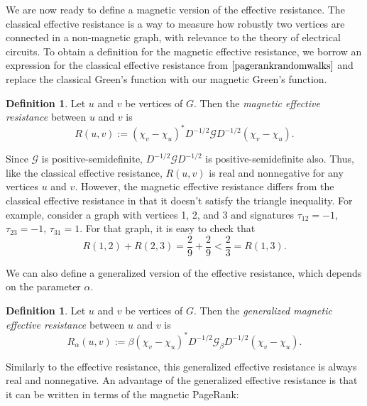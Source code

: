 \documentclass{article}
\theoremstyle{definition}
\newtheorem{defn}[thm]{Definition}
\newcommand{\green}{\mathcal{G}}
\begin{document}
We are now ready to define a magnetic version of the effective resistance. The classical effective resistance is a way to measure how robustly two vertices are connected in a non-magnetic graph, with relevance to the theory of electrical circuits. To obtain a definition for the magnetic effective resistance, we borrow an expression for the classical effective resistance from $\cite{pagerankrandomwalks}$ and replace the classical Green's function with our magnetic Green's function.

\begin{defn}
Let $u$ and $v$ be vertices of $G$. Then the  \textit{magnetic effective resistance} between $u$ and $v$ is 
$$
R(u, v) := (\chi_v - \chi_u)^* D^{-1/2} \green D^{-1/2} (\chi_v - \chi_u).
$$
\end{defn}

Since $\green$ is positive-semidefinite, $D^{-1/2} \green D^{-1/2}$ is positive-semidefinite also. Thus, like the classical effective resistance, $R(u, v)$ is real and nonnegative for any vertices $u$ and $v$. However, the magnetic effective resistance differs from the classical effective resistance in that it doesn't satisfy the triangle inequality. For example, consider a graph with vertices 1, 2, and 3 and signatures $\tau_{12} = -1$, $\tau_{23} = -1$, $\tau_{31} = 1$. For that graph, it is easy to check that
$$
R(1, 2) + R(2, 3) = \frac{2}{9} + \frac{2}{9} < \frac{2}{3} = R(1, 3).
$$

We can also define a generalized version of the effective resistance, which depends on the parameter $\alpha$.

\begin{defn}
Let $u$ and $v$ be vertices of $G$. Then the \textit{generalized magnetic effective resistance} between $u$ and $v$ is 
$$
R_\alpha(u, v) := \beta (\chi_v - \chi_u)^* D^{-1/2} \green_\beta D^{-1/2} (\chi_v - \chi_u).
$$
\end{defn}

Similarly to the effective resistance, this generalized effective resistance is always real and nonnegative. An advantage of the generalized effective resistance is that it can be written in terms of the magnetic PageRank:
\end{document}
